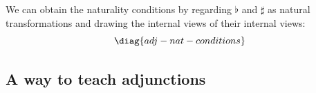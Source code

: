\documentclass[oneside,12pt]{article}
\begin{document}
We can obtain the naturality conditions by regarding $♭$ and $♯$ as
natural transformations and drawing the internal views of their
internal views:
%
$$\pu
  \diag{adj-nat-conditions}
$$





%
\subsection{A way to teach adjunctions \DONE}
\label{teaching-adjunctions}
\end{document}
